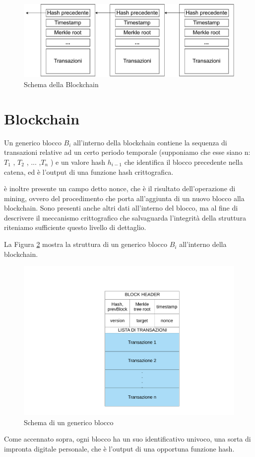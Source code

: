 \begin{figure}[h!]
    \centering
    \includegraphics[scale=0.6]{Images/blockChaining.pdf}
    \caption{Schema della Blockchain}
    \label{fig:blockchain}
\end{figure}
\FloatBarrier
\section{Blockchain}
Un generico blocco $B_i$ all’interno della blockchain contiene la sequenza di transazioni relative ad un certo periodo temporale (supponiamo che esse siano n: $T_1$ , $T_2$ , ... ,$T_n$ ) e un valore hash $h_{i-1}$ che identifica il blocco precedente nella catena, ed è l’output di una funzione hash crittografica.

è inoltre presente un campo detto nonce, che è il risultato dell’operazione di mining, ovvero del procedimento che porta all’aggiunta di un nuovo blocco alla blockchain. Sono presenti anche altri dati all’interno del blocco, ma al fine di descrivere il meccanismo crittografico che salvaguarda l’integrità della struttura riteniamo sufficiente questo livello di dettaglio.

La Figura \ref{fig:blocchi} mostra la struttura di un generico blocco $B_i$ all’interno della blockchain.
\begin{figure}[h!]
    \centering
    \includegraphics[scale=0.4, trim = 0cm 0cm 0cm 3cm, clip]{Images/blocco_singolo.pdf}
    \caption{Schema di un generico blocco}
    \label{fig:blocchi}
\end{figure}
\FloatBarrier
Come accennato sopra, ogni blocco ha un suo identificativo univoco, una sorta di impronta digitale personale, che è l’output di una opportuna funzione hash.

